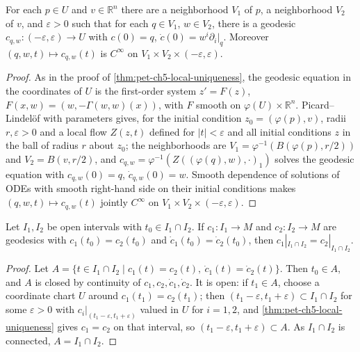 \begin{theorem}
  \label{thm:pet-ch5-local-existence}
  For each $p\in U$ and $v\in\mathbb R^n$ there are a neighborhood $V_1$ of $p$, a
  neighborhood $V_2$ of $v$, and $\varepsilon>0$ such that for each $q\in V_1$,
  $w\in V_2$, there is a geodesic $c_{q,w}:(-\varepsilon,\varepsilon)\to U$ with $c(0)=q$,
  $\dot c(0)=w^i\partial_i|_q$. Moreover $(q,w,t)\mapsto c_{q,w}(t)$ is $C^\infty$ on
  $V_1\times V_2\times(-\varepsilon,\varepsilon)$.
\end{theorem}
\begin{proof}
  As in the proof of \cref{thm:pet-ch5-local-uniqueness}, the geodesic
  equation in the coordinates of $U$ is the first-order system $z'=F(z)$,
  $F(x,w)=(w,-\Gamma(w,w)(x))$, with $F$ smooth on
  $\varphi(U)\times\mathbb R^n$. Picard--Lindel\"of with parameters gives, for
  the initial condition $z_0=(\varphi(p),v)$, radii $r,\varepsilon>0$ and a
  local flow $Z(z,t)$ defined for $|t|<\varepsilon$ and all initial conditions
  $z$ in the ball of radius $r$ about $z_0$; the neighborhoods are
  $V_1=\varphi^{-1}(B(\varphi(p),r/2))$ and $V_2=B(v,r/2)$, and
  $c_{q,w}=\varphi^{-1}(Z((\varphi(q),w),\cdot)_1)$ solves the geodesic
  equation with $c_{q,w}(0)=q$, $\dot c_{q,w}(0)=w$. Smooth dependence of
  solutions of ODEs with smooth right-hand side on their initial conditions
  makes $(q,w,t)\mapsto c_{q,w}(t)$ jointly $C^\infty$ on
  $V_1\times V_2\times(-\varepsilon,\varepsilon)$.
\end{proof}

\begin{lemma}
  \label{lem:pet-ch5-global-uniqueness}
  \leanok
  Let $I_1,I_2$ be open intervals with $t_0\in I_1\cap I_2$. If $c_1:I_1\to M$ and
  $c_2:I_2\to M$ are geodesics with $c_1(t_0)=c_2(t_0)$ and $\dot c_1(t_0)=\dot c_2(t_0)$,
  then $c_1|_{I_1\cap I_2}=c_2|_{I_1\cap I_2}$.
\end{lemma}
\begin{proof}
  Let $A=\{t\in I_1\cap I_2\mid c_1(t)=c_2(t),\ \dot c_1(t)=\dot c_2(t)\}$. Then
  $t_0\in A$, and $A$ is closed by continuity of $c_1,c_2,\dot c_1,\dot c_2$. It is
  open: if $t_1\in A$, choose a coordinate chart $U$ around $c_1(t_1)=c_2(t_1)$; then
  $(t_1-\varepsilon,t_1+\varepsilon)\subset I_1\cap I_2$ for some $\varepsilon>0$ with
  $c_i|_{(t_1-\varepsilon,t_1+\varepsilon)}$ valued in $U$ for $i=1,2$, and
  \cref{thm:pet-ch5-local-uniqueness} gives $c_1=c_2$ on that interval, so
  $(t_1-\varepsilon,t_1+\varepsilon)\subset A$. As $I_1\cap I_2$ is connected, $A=I_1\cap I_2$.
\end{proof}

